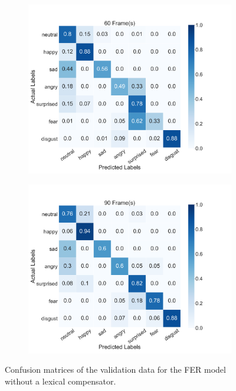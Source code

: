 \begin{figure}
\begin{subfigure}[b]{0.45\textwidth}
      \includegraphics[width=\textwidth]{res/conf_fer_60.png}
    \end{subfigure}
    \begin{subfigure}[b]{0.45\textwidth}
      \includegraphics[width=\textwidth]{res/conf_fer_90.png}
    \end{subfigure}
    \caption{Confusion matrices of the validation data for the FER model without a lexical compensator.}
    \label{fig:fer_conf}
\end{figure}

